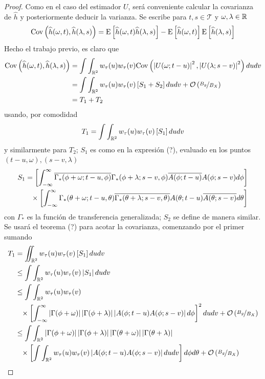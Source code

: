 \begin{proof}
Como en el caso del estimador $U$, será conveniente calcular la covarianza de $\widehat{h}$ y posteriormente deducir la varianza. Se escribe para $t, s \in \mathcal{T}$ y $\omega, \lambda \in \mathbb{R}$
\begin{equation}
\mathrm{Cov}\left( \widehat{h}(\omega, t),\widehat{h}(\lambda, s) \right) = \mathrm{E}\left[ \widehat{h}(\omega, t)\widehat{h}(\lambda, s) \right] - \mathrm{E}\left[ \widehat{h}(\omega, t) \right]\mathrm{E}\left[ \widehat{h}(\lambda, s) \right]
\end{equation}
Hecho el trabajo previo, es claro que
\begin{align*}
\mathrm{Cov}\left( \widehat{h}(\omega, t), \widehat{h}(\lambda, s) \right) &=
\int \int_{\mathbb{R}^{2}} w_\tau(u) w_\tau(v) \mathrm{Cov}\left( \left| U(\omega; t-u) \right|^{2},\left| U(\lambda; s-v) \right|^{2} \right) du dv \\
&=
\int \int_{\mathbb{R}^{2}} w_\tau(u) w_\tau(v) \left[ S_1 + S_2 \right] du dv + \mathcal{O}\left( \nicefrac{B_g}{B_X} \right) \\
&= T_1 + T_2
\end{align*}
usando, por comodidad
\begin{equation}
T_1 = \int \int_{\mathbb{R}^{2}} w_\tau(u) w_\tau(v) \left[ S_1 \right] du dv
\end{equation}
y similarmente para $T_2$; $S_1$ es como en la expresión (?), evaluado en los puntos $(t-u,\omega), (s-v, \lambda)$
\begin{align*}
S_1 &=
 \left[ \intR \overline{\Gamma_*(\phi + \omega; t-u, \phi)} \Gamma_*(\phi+ \lambda; s-v, \phi)
 \overline{A(\phi; t-u)} A(\phi; s-v) d\phi \right] \\
 &\pheq \times \left[ \intR \Gamma_*(\theta+ \omega; t-u, \theta) 
  \overline{\Gamma_*(\theta + \lambda; s-v, \theta)}  
 A(\theta; t-u)   \overline{A(\theta; s-v)} d\theta \right] 
\end{align*}
con $\Gamma_*$ es la función de transferencia generalizada; $S_2$ se define de manera similar.
Se usará el teorema (?) para acotar la covarianza, comenzando por el primer sumando
\begin{align*}
T_1 &= 
\iint_{\R^{2}} w_\tau(u) w_\tau(v) \left[ S_1 \right] du dv \\
&\leq
\int \int_{\R^{2}} w_\tau(u) w_\tau(v) \abso{ S_1 } du dv \\
&\leq 
\int \int_{\R^{2}} 
w_\tau(u) w_\tau(v) \\
&\pheq 
 \times \left[ \intR
 \abso{\Gamma(\phi + \omega)} \abso{\Gamma(\phi+ \lambda)}
 \abso{A(\phi; t-u) A(\phi; s-v)} d\phi \right]^{2}
 du dv + \orden{\nicefrac{B_g}{B_X}} \\
&\leq 
\int \int_{\R^{2}} \abso{\Gamma(\phi + \omega)} \abso{\Gamma(\phi+ \lambda)}
\abso{\Gamma(\theta + \omega)} \abso{\Gamma(\theta+ \lambda)} \\
&\pheq 
 \times \left[ \int \int_{\R^{2}}  w_\tau(u) w_\tau(v)
 \abso{A(\phi; t-u) A(\phi; s-v)} du dv \right]
 d\phi d\theta + \orden{\nicefrac{B_g}{B_X}} \\
\end{align*}
\end{proof}


